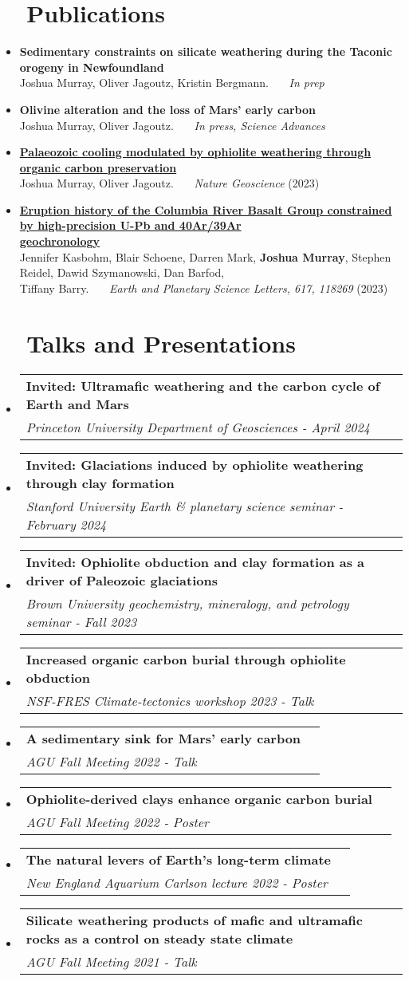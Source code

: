 \documentclass[letterpaper,20pt]{article}
\makeatletter
\newcommand{\resumeItem}[2]{
  \item\normalsize{
    \textbf{#1}{ #2 \vspace{-2pt}}
  }
}
\newcommand{\resumeSubheading}[4]{
  \vspace{-1pt}\item
    \begin{tabular*}{0.97\textwidth}{l@{\extracolsep{\fill}}r}
      \textbf{#1} & #2 \\
      \textit{#3} & \textit{#4} \\
    \end{tabular*}\vspace{-5pt}
}
\newcommand{\resumeSubHeadingListStart}{\begin{itemize}[leftmargin=*]}
\newcommand{\resumeSubHeadingListEnd}{\end{itemize}}
\makeatother
\begin{document}
\section{~~Publications}
  \resumeSubHeadingListStart
    \resumeItem
    {Sedimentary constraints on silicate weathering during the Taconic orogeny in Newfoundland}
    {\\Joshua Murray, Oliver Jagoutz, Kristin Bergmann.~~~ \textit{In prep}}
    \resumeItem
    {Olivine alteration and the loss of Mars' early carbon}{\\Joshua Murray, Oliver Jagoutz.~~~ \textit{In press, Science Advances}}
    \resumeItem
    {\href{https://doi.org/10.1038/s41561-023-01342-9}{Palaeozoic cooling modulated by ophiolite weathering through organic carbon preservation}}{\\Joshua Murray, Oliver Jagoutz.~~~ \textit{Nature Geoscience} (2023)}
    \resumeItem
    {\href{https://doi.org/10.1016/j.epsl.2023.118269}{Eruption history of the Columbia River Basalt Group constrained by high-precision U-Pb and 40Ar/39Ar\\ geochronology}}{\\Jennifer Kasbohm, Blair Schoene, Darren Mark, \textbf{Joshua Murray}, Stephen Reidel, Dawid Szymanowski, Dan Barfod,\\ Tiffany Barry.~~~ \textit{Earth and Planetary Science Letters, 617, 118269} (2023)}
\resumeSubHeadingListEnd

\vspace{3pt}
\section{~~Talks and Presentations}
  \resumeSubHeadingListStart
    \resumeSubheading
    {Invited: Ultramafic weathering and the carbon cycle of Earth and Mars}{}
    {Princeton University Department of Geosciences - April 2024}{} 
    \resumeSubheading
    {Invited: Glaciations induced by ophiolite weathering through clay formation}{}
    {Stanford University Earth \& planetary science seminar - February 2024}{} 
    \resumeSubheading
    {Invited: Ophiolite obduction and clay formation as a driver of Paleozoic glaciations}{}
    {Brown University geochemistry, mineralogy, and petrology seminar - Fall 2023}{} 
    \resumeSubheading
    {Increased organic carbon burial through ophiolite obduction}{}
    {NSF-FRES Climate-tectonics workshop 2023 - Talk}{}  
   \resumeSubheading
    {A sedimentary sink for Mars' early carbon}{}
    {AGU Fall Meeting 2022 - Talk}{}  
  \resumeSubheading
    {Ophiolite-derived clays enhance organic carbon burial}{}
    {AGU Fall Meeting 2022 - Poster}{}
  \resumeSubheading
    {The natural levers of Earth's long-term climate}{}
    {New England Aquarium Carlson lecture 2022 - Poster}{}
  \resumeSubheading
    {Silicate weathering products of mafic and ultramafic rocks as a control on steady state climate}{}
    {AGU Fall Meeting 2021 - Talk}{}
\resumeSubHeadingListEnd
    
\end{document}
